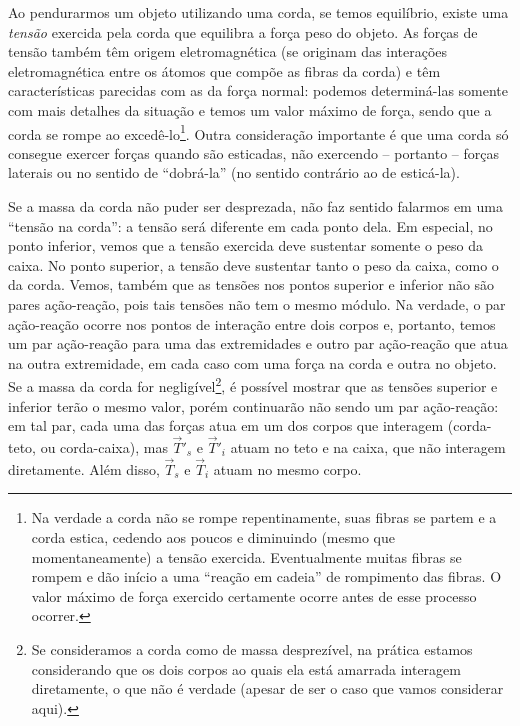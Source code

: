 Ao pendurarmos um objeto utilizando uma corda, se temos equilíbrio, existe uma \emph{tensão} exercida pela corda que equilibra a força peso do objeto. As forças de tensão também têm origem eletromagnética (se originam das interações eletromagnética entre os átomos que compõe as fibras da corda) e têm características parecidas com as da força normal: podemos determiná-las somente com mais detalhes da situação e temos um valor máximo de força, sendo que a corda se rompe ao excedê-lo\footnote{Na verdade a corda não se rompe repentinamente, suas fibras se partem e a corda estica, cedendo aos poucos e diminuindo (mesmo que momentaneamente) a tensão exercida. Eventualmente muitas fibras se rompem e dão início a uma ``reação em cadeia'' de rompimento das fibras. O valor máximo de força exercido certamente ocorre antes de esse processo ocorrer.}. Outra consideração importante é que uma corda só consegue exercer forças quando são esticadas, não exercendo -- portanto -- forças laterais ou no sentido de ``dobrá-la'' (no sentido contrário ao de esticá-la). 

Se a massa da corda não puder ser desprezada, não faz sentido falarmos em uma ``tensão na corda'': a tensão será diferente em cada ponto dela. Em especial, no ponto inferior, vemos que a tensão exercida deve sustentar somente o peso da caixa. No ponto superior, a tensão deve sustentar tanto o peso da caixa, como o da corda. Vemos, também que as tensões nos pontos superior e inferior não são pares ação-reação, pois tais tensões não tem o mesmo módulo. Na verdade, o par ação-reação ocorre nos pontos de interação entre dois corpos e, portanto, temos um par ação-reação para uma das extremidades e outro par ação-reação que atua na outra extremidade, em cada caso com uma força na corda e outra no objeto. Se a massa da corda for negligível\footnote{Se consideramos a corda como de massa desprezível, na prática estamos considerando que os dois corpos ao quais ela está amarrada interagem diretamente, o que não é verdade (apesar de ser o caso que vamos considerar aqui).}, é possível mostrar que as tensões superior e inferior terão o mesmo valor, porém continuarão não sendo um par ação-reação: em tal par, cada uma das forças atua em um dos corpos que interagem (corda-teto, ou corda-caixa), mas $\vec{T}'_s$ e $\vec{T}'_i$ atuam no teto e na caixa, que não interagem diretamente. Além disso, $\vec{T}_s$ e $\vec{T}_i$ atuam no mesmo corpo.

